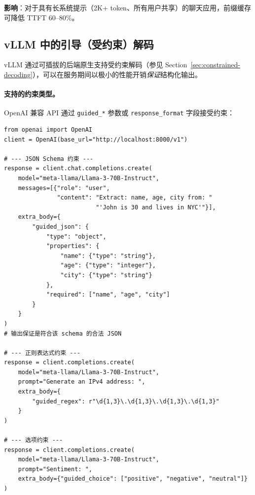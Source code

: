 \textbf{影响}：对于具有长系统提示（2K+ token、所有用户共享）的聊天应用，前缀缓存可降低 TTFT 60--80\%。

\subsection{vLLM 中的引导（受约束）解码}
\label{sec:vllm-guided-decoding}

vLLM 通过可插拔的后端原生支持受约束解码（参见 Section~\ref{sec:constrained-decoding}），可以在服务期间以极小的性能开销\emph{保证}结构化输出。

\paragraph{支持的约束类型。}
\label{supported-constraint-types.}

OpenAI 兼容 API 通过 \texttt{guided\_*} 参数或 \texttt{response\_format} 字段接受约束：

\begin{lstlisting}[style=pythonstyle]
from openai import OpenAI
client = OpenAI(base_url="http://localhost:8000/v1")

# --- JSON Schema 约束 ---
response = client.chat.completions.create(
    model="meta-llama/Llama-3-70B-Instruct",
    messages=[{"role": "user",
               "content": "Extract: name, age, city from: "
                          "'John is 30 and lives in NYC'"}],
    extra_body={
        "guided_json": {
            "type": "object",
            "properties": {
                "name": {"type": "string"},
                "age": {"type": "integer"},
                "city": {"type": "string"}
            },
            "required": ["name", "age", "city"]
        }
    }
)
# 输出保证是符合该 schema 的合法 JSON

# --- 正则表达式约束 ---
response = client.completions.create(
    model="meta-llama/Llama-3-70B-Instruct",
    prompt="Generate an IPv4 address: ",
    extra_body={
        "guided_regex": r"\d{1,3}\.\d{1,3}\.\d{1,3}\.\d{1,3}"
    }
)

# --- 选项约束 ---
response = client.completions.create(
    model="meta-llama/Llama-3-70B-Instruct",
    prompt="Sentiment: ",
    extra_body={"guided_choice": ["positive", "negative", "neutral"]}
)
\end{lstlisting}

